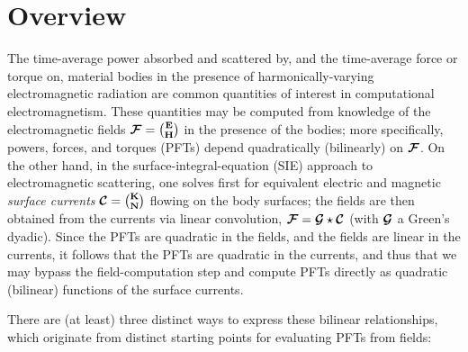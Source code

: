 \newpage
\section{Overview}

The time-average power absorbed and scattered by, and the
time-average force or torque on, material bodies in the presence
of harmonically-varying electromagnetic radiation
are common quantities of interest in computational electromagnetism.
These quantities may be computed from knowledge of the
electromagnetic fields $\boldsymbol{\mathcal{F}}={\mathbf{E} \choose \mathbf{H}}$ in the 
presence of the bodies; more specifically, powers, forces,
and torques (PFTs) depend quadratically (bilinearly) on $\boldsymbol{\mathcal{F}}$.
On the other hand, in the surface-integral-equation (SIE) approach 
to electromagnetic scattering, one solves first for equivalent electric and 
magnetic \textit{surface currents} $\boldsymbol{\mathcal{C}}={\mathbf{K} \choose \mathbf{N}}$
flowing on the body surfaces; the fields are then obtained from
the currents via linear convolution, $\boldsymbol{\mathcal{F}}=\boldsymbol{\mathcal{G}} \star \boldsymbol{\mathcal{C}}$
(with $\boldsymbol{\mathcal{G}}$ a Green's dyadic). Since the PFTs are quadratic 
in the fields, and the fields are linear in the currents, it follows 
that the PFTs are quadratic in the currents, and thus that
we may bypass the field-computation step and compute PFTs directly 
as quadratic (bilinear) functions of the surface currents.

There are (at least) three distinct ways to express these
bilinear relationships, which originate from distinct
starting points for evaluating PFTs from fields:

